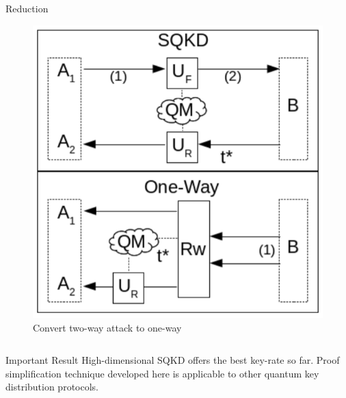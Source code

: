 \documentclass[final]{beamer}
\newlength{\onecolwid}
\newlength{\twocolwid}
\begin{document}
\begin{frame}[t]
\begin{columns}[t]
\begin{column}{\twocolwid}
\begin{columns}[t,totalwidth=\twocolwid]
\begin{column}{\onecolwid}\vspace{-.6in} %


\begin{block}{Reduction}
\begin{figure}
	\includegraphics[width=0.8\linewidth]{oneway.png}
	\caption{Convert two-way attack to one-way}
\end{figure}


\end{block}


\end{column} %

\end{columns} %


\begin{alertblock}{Important Result}
High-dimensional SQKD offers the best key-rate so far. Proof simplification technique developed here is applicable to other quantum key distribution protocols.
\end{alertblock} 


\end{column}
\end{columns}
\end{frame}
\end{document}

